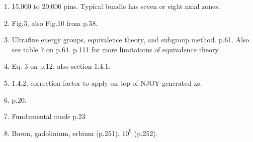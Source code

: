\documentclass{school-22.211-notes}
\begin{document}
\begin{enumerate}
\item 15,000 to 20,000 pins. Typical bundle has seven or eight axial zones.
\item Fig.3, also Fig.10 from p.58.
\item Ultrafine energy groups, equivalence theory, and subgroup
  method. p.61. Also see table 7 on p.64. p.111 for more limitations of equivalence theory. 
\item Eq. 3 on p.12, also section 1.4.1. 
\item 1.4.2, correction factor to apply on top of NJOY-generated xs.

\item p.20.

\item Fundamental mode p.23

\item Boron, gadolinium, erbium (p.251). $10^9$ (p.252).
  
\end{enumerate}
\fi


\clearpage
\end{document}
